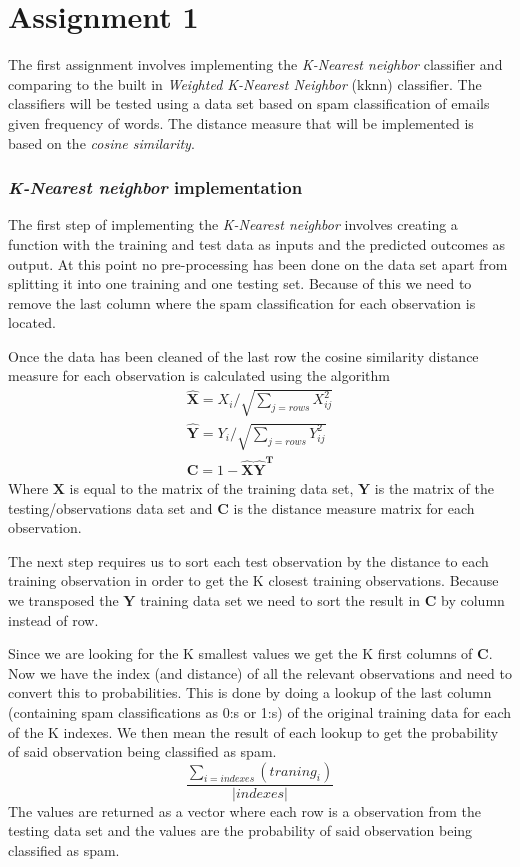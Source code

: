 \documentclass[a4paper,12pt]{article}
\begin{document}
\section{Assignment 1}

The first assignment involves implementing the \textit{K-Nearest neighbor} classifier and comparing to the built in \textit{Weighted K-Nearest Neighbor} (kknn) classifier. The classifiers will be tested using a data set based on spam classification of emails given frequency of words. The distance measure that will be implemented is based on the \textit{cosine similarity}. 

\subsubsection{\textit{K-Nearest neighbor} implementation}

The first step of implementing the \textit{K-Nearest neighbor} involves creating a function with the training and test data as inputs and the predicted outcomes as output. At this point no pre-processing has been done on the data set apart from splitting it into one training and one testing set. Because of this we need to remove the last column where the spam classification for each observation is located. 

Once the data has been cleaned of the last row the cosine similarity distance measure for each observation is calculated using the algorithm
\begin{align*}
  \widehat{\mathbf{X}} = {X_i}/\sqrt{\sum_{j = rows}{X_{ij}^2}} \\
  \widehat{\mathbf{Y}} = {Y_i}/\sqrt{\sum_{j = rows}{Y_{ij}^2}} \\
  \textbf{C} = 1 - \widehat{\mathbf{X}}\widehat{\mathbf{Y}}^\textbf{T}
  \end{align*}
Where \(\mathbf{X}\) is equal to the matrix of the training data set, \(\mathbf{Y}\) is the matrix of the testing/observations data set and  \(\mathbf{C}\) is the distance measure matrix for each observation.

The next step requires us to sort each test observation by the distance to each training observation in order to get the K closest training observations. Because we transposed the \( \mathbf{Y}\) training data set we need to sort the result in \(\mathbf{C}\) by column instead of row.

Since we are looking for the K smallest values we get the K first columns of \(\mathbf{C}\). Now we have the index (and distance) of all the relevant observations and need to convert this to probabilities. This is done by doing a lookup of the last column (containing spam classifications as 0:s or 1:s) of the original training data for each of the K indexes. We then mean the result of each lookup to get the probability of said observation being classified as spam. 
\begin{equation}
  \frac{\sum_{i = indexes}({traning_i})}{\left | indexes \right |}
\end{equation} 
The values are returned as a vector where each row is a observation from the testing data set and the values are the probability of said observation being classified as spam.
\end{document}
